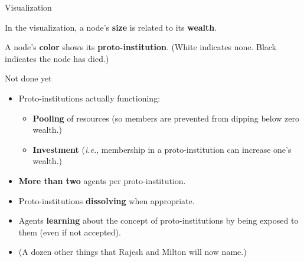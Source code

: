 \documentclass[12pt,handout]{beamer}
\begin{document}
\begin{frame}[c]{Visualization}

In the visualization, a node's \textbf{size} is related to its \textbf{wealth}.

\pause
\bigskip

A node's \textbf{color} shows its \textbf{proto-institution}. (White indicates
none. Black indicates the node has died.)

\end{frame}

\begin{frame}[c]{Not done yet}

\pause
\begin{itemize}
\itemsep.1em
\item Proto-institutions actually functioning:
    \begin{itemize}
    \item \textbf{Pooling} of resources (so members are prevented from dipping
below zero wealth.)
\pause
    \item \textbf{Investment} (\textit{i.e.}, membership in a proto-institution
can increase one's wealth.)
    \end{itemize}
\pause
\item \textbf{More than two} agents per proto-institution.
\pause
\item Proto-institutions \textbf{dissolving} when appropriate.
\pause
\item Agents \textbf{learning} about the concept of proto-institutions by being
exposed to them (even if not accepted).
\pause
\item (A dozen other things that Rajesh and Milton will now name.)
\end{itemize}

\end{frame}
\end{document}
